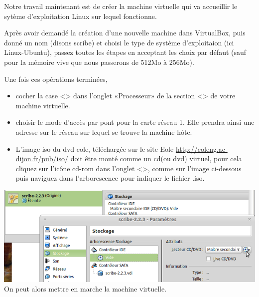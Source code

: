 \documentclass{article}
\makeatletter
\def\maxwidth{\ifdim\Gin@nat@width>\linewidth\linewidth
\else\Gin@nat@width\fi}
\let\Oldincludegraphics\includegraphics
\renewcommand{\includegraphics}[1]{\Oldincludegraphics[width=\maxwidth]{#1}}
\makeatother
\begin{document}
Notre travail maintenant est de créer la machine virtuelle qui va
accueillir le sytème d'exploitation Linux sur lequel fonctionne.

Après avoir demandé la création d'une nouvelle machine dans VirtualBox,
puis donné un nom (disons scribe) et choisi le type de système
d'exploitaion (ici Linux-Ubuntu), passez toutes les étapes en acceptant
les choix par défaut (sauf pour la mémoire vive que nous passerons de
512Mo à 256Mo).

Une fois ces opérations terminées,

\begin{itemize}
\item
  cocher la case \textless{}\textgreater{} dans l'onglet «Processeur» de
  la section \textless{}\textgreater{} de votre machine virtuelle.
\item
  choisir le mode d'accès par pont pour la carte réseau 1. Elle prendra
  ainsi une adresse sur le réseau sur lequel se trouve la machine hôte.
\item
  L'image iso du dvd eole, téléchargée sur le site Eole
  \url{http://eoleng.ac-dijon.fr/pub/iso/} doit être monté comme un
  cd(ou dvd) virtuel, pour cela cliquez sur l'icône cd-rom dans l'onglet
  \textless{}\textgreater{}, comme sur l'image ci-dessous puis naviguez
  dans l'arborescence pour indiquer le fichier .iso.
\end{itemize}
\includegraphics{scribe_html_m69a9bc5b.png}\\ On peut alors mettre en
marche la machine virtuelle.
\end{document}

